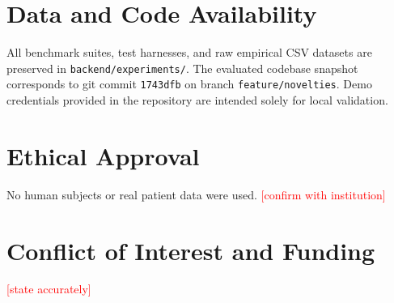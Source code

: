 \documentclass[journal]{IEEEtran}
\newcommand{\todo}[1]{\textcolor{red}{[#1]}}
\begin{document}
\section*{Data and Code Availability}\label{sec:avail}
All benchmark suites, test harnesses, and raw empirical CSV datasets are preserved
in \texttt{backend/experiments/}. The evaluated codebase snapshot corresponds to
git commit \texttt{1743dfb} on branch \texttt{feature/novelties}. Demo credentials
provided in the repository are intended solely for local validation.

\section*{Ethical Approval}
No human subjects or real patient data were used. \todo{confirm with institution}

\section*{Conflict of Interest and Funding}
\todo{state accurately}
\end{document}

